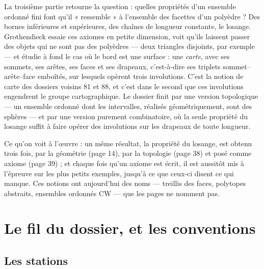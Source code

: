 \documentclass[11pt,a4paper]{article}
\begin{document}
\begin{resume}
La troisième partie retourne la question : quelles propriétés d'un ensemble
ordonné fini font qu'il « ressemble » à l'ensemble des facettes d'un polyèdre ?
Des bornes inférieures et supérieures, des chaînes de longueur constante, le
losange. Grothendieck essaie ces axiomes en petite dimension, voit qu'ils
laissent passer des objets qui ne sont pas des polyèdres --- deux triangles
disjoints, par exemple --- et étudie à fond le cas où le bord est une surface :
une \emph{carte}, avec ses sommets, ses arêtes, ses faces et ses drapeaux,
c'est-à-dire ses triplets sommet--arête--face emboîtés, sur lesquels opèrent
trois involutions. C'est la notion de carte des dossiers voisins 81 et 88,
et c'est dans le second que ces involutions engendrent le groupe
cartographique. Le dossier finit par
une version topologique --- un ensemble ordonné dont les intervalles, réalisés
géométriquement, sont des sphères --- et par une version purement
combinatoire, où la seule propriété du losange suffit à faire opérer des
involutions sur les drapeaux de toute longueur.

Ce qu'on voit à l'œuvre : un même résultat, la propriété du losange, est
obtenu trois fois, par la géométrie (page 14), par la topologie (page 38) et
posé comme axiome (page 39) ; et chaque fois qu'un axiome est écrit, il est
aussitôt mis à l'épreuve sur les plus petits exemples, jusqu'à ce que ceux-ci
disent ce qui manque. Ces notions ont aujourd'hui des noms --- treillis des
faces, polytopes abstraits, ensembles ordonnés CW --- que les pages ne
nomment pas.

\end{resume}

\section*{Le fil du dossier, et les conventions}

\subsection*{Les stations}
\end{document}
